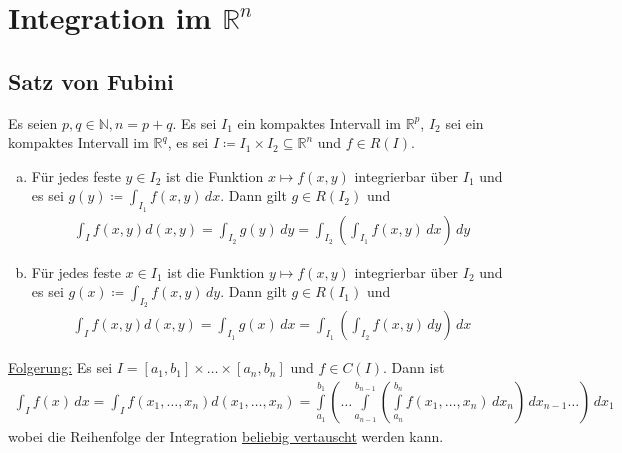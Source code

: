 \section{Integration im $\mathbb{R}^n$}
\subsection{Satz von Fubini}
Es seien $p,q \in \mathbb{N}, n=p+q$. Es sei $I_1$ ein kompaktes Intervall im $\mathbb{R}^p$, $I_2$ sei ein kompaktes Intervall im $\mathbb{R}^q$,
es sei $I \coloneqq I_1 \times I_2 \subseteq \mathbb{R}^n$ und $f \in R(I)$.
\begin{enumerate} [a)]
    \item Für jedes feste $y \in I_2$ ist die Funktion $x \mapsto f(x,y)$ integrierbar über  $I_1$ und es sei 
    $g(y) \coloneqq \int_{I_1} f(x,y)\,dx$. Dann gilt $g \in R(I_2)$ und
    \begin{align*}
        \int_I f(x,y) d(x,y) = \int_{I_2} g(y)\,dy = \int_{I_2} (\int_{I_1} f(x,y)\,dx)\,dy
    \end{align*}
    \item Für jedes feste $x \in I_1$ ist die Funktion $y \mapsto f(x,y)$ integrierbar über  $I_2$ und es sei 
    $g(x) \coloneqq \int_{I_2} f(x,y)\,dy$. Dann gilt $g \in R(I_1)$ und
    \begin{align*}
        \int_I f(x,y) d(x,y) = \int_{I_1} g(x)\,dx = \int_{I_1} (\int_{I_2} f(x,y)\,dy)\,dx
    \end{align*}
\end{enumerate}
\underline{Folgerung:} Es sei $I = [a_1,b_1] \times \ldots \times [a_n,b_n]$ und $f \in C(I)$. Dann ist
\begin{align*}
    \int_I f(x)\,dx = \int_I f(x_1, \ldots, x_n) d(x_1, \ldots, x_n) = \int \limits_{a_1}^{b_1} (\ldots \int \limits_{a_{n-1}}^{b_{n-1}}(\int \limits_{a_n}^{b_n}
    f(x_1,\ldots,x_n)\,dx_n)\,dx_{n-1}\ldots)\,dx_1
\end{align*}
wobei die Reihenfolge der Integration \underline{beliebig vertauscht} werden kann.

